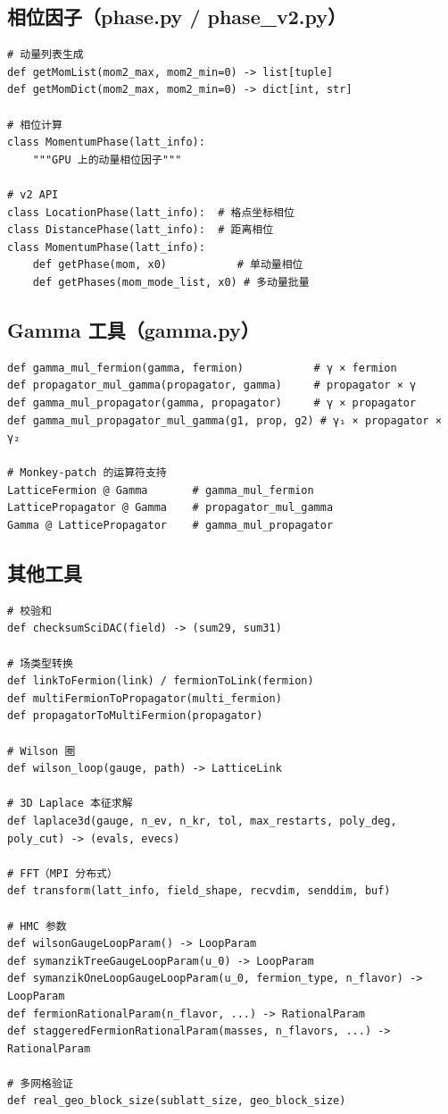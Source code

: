 \documentclass[12pt,a4paper]{ctexart}
\begin{document}
\subsection{相位因子（phase.py / phase\_v2.py）}

\begin{lstlisting}[style=pycode]
# 动量列表生成
def getMomList(mom2_max, mom2_min=0) -> list[tuple]
def getMomDict(mom2_max, mom2_min=0) -> dict[int, str]

# 相位计算
class MomentumPhase(latt_info):
    """GPU 上的动量相位因子"""

# v2 API
class LocationPhase(latt_info):  # 格点坐标相位
class DistancePhase(latt_info):  # 距离相位
class MomentumPhase(latt_info):
    def getPhase(mom, x0)           # 单动量相位
    def getPhases(mom_mode_list, x0) # 多动量批量
\end{lstlisting}

\subsection{Gamma 工具（gamma.py）}

\begin{lstlisting}[style=pycode]
def gamma_mul_fermion(gamma, fermion)           # γ × fermion
def propagator_mul_gamma(propagator, gamma)     # propagator × γ
def gamma_mul_propagator(gamma, propagator)     # γ × propagator
def gamma_mul_propagator_mul_gamma(g1, prop, g2) # γ₁ × propagator × γ₂

# Monkey-patch 的运算符支持
LatticeFermion @ Gamma       # gamma_mul_fermion
LatticePropagator @ Gamma    # propagator_mul_gamma
Gamma @ LatticePropagator    # gamma_mul_propagator
\end{lstlisting}

\subsection{其他工具}

\begin{lstlisting}[style=pycode]
# 校验和
def checksumSciDAC(field) -> (sum29, sum31)

# 场类型转换
def linkToFermion(link) / fermionToLink(fermion)
def multiFermionToPropagator(multi_fermion)
def propagatorToMultiFermion(propagator)

# Wilson 圈
def wilson_loop(gauge, path) -> LatticeLink

# 3D Laplace 本征求解
def laplace3d(gauge, n_ev, n_kr, tol, max_restarts, poly_deg, poly_cut) -> (evals, evecs)

# FFT（MPI 分布式）
def transform(latt_info, field_shape, recvdim, senddim, buf)

# HMC 参数
def wilsonGaugeLoopParam() -> LoopParam
def symanzikTreeGaugeLoopParam(u_0) -> LoopParam
def symanzikOneLoopGaugeLoopParam(u_0, fermion_type, n_flavor) -> LoopParam
def fermionRationalParam(n_flavor, ...) -> RationalParam
def staggeredFermionRationalParam(masses, n_flavors, ...) -> RationalParam

# 多网格验证
def real_geo_block_size(sublatt_size, geo_block_size)
\end{lstlisting}
\end{document}
